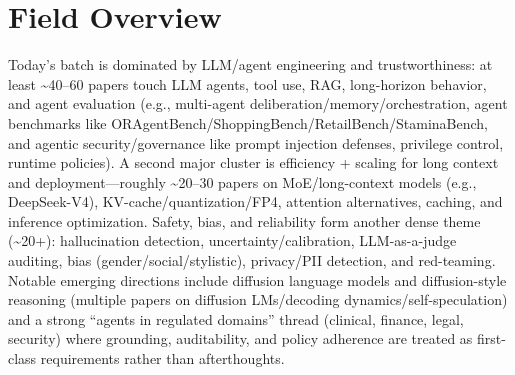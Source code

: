 \documentclass[12pt,letterpaper]{article}
\begin{document}
\medskip



\section*{Field Overview}
{\footnotesize Today's batch is dominated by LLM/agent engineering and trustworthiness: at least \textasciitilde{}40--60 papers touch LLM agents, tool use, RAG, long-horizon behavior, and agent evaluation (e.g., multi-agent deliberation/memory/orchestration, agent benchmarks like ORAgentBench/ShoppingBench/RetailBench/StaminaBench, and agentic security/governance like prompt injection defenses, privilege control, runtime policies). A second major cluster is efficiency + scaling for long context and deployment---roughly \textasciitilde{}20--30 papers on MoE/long-context models (e.g., DeepSeek-V4), KV-cache/quantization/FP4, attention alternatives, caching, and inference optimization. Safety, bias, and reliability form another dense theme (\textasciitilde{}20+): hallucination detection, uncertainty/calibration, LLM-as-a-judge auditing, bias (gender/social/stylistic), privacy/PII detection, and red-teaming. Notable emerging directions include diffusion language models and diffusion-style reasoning (multiple papers on diffusion LMs/decoding dynamics/self-speculation) and a strong ``agents in regulated domains'' thread (clinical, finance, legal, security) where grounding, auditability, and policy adherence are treated as first-class requirements rather than afterthoughts.}
\end{document}
